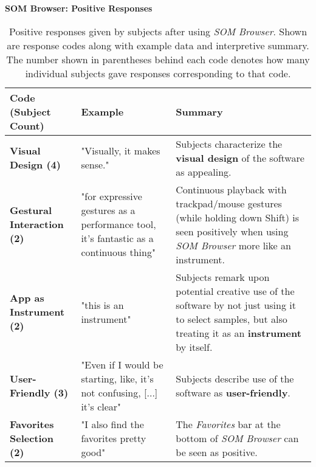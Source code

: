 \begin{table}[!htb]
  \renewcommand{\arraystretch}{1.2}
  \centering
  \textbf{SOM Browser: Positive Responses} \\ [3mm]
  \footnotesize
  \colorbox{light-bg}{
  \begin{tabular}{ p{4.0cm} p{4.75cm} p{4.75cm} }
  \hline
    \textbf{Code (Subject Count)} & \textbf{Example} & \textbf{Summary} \\
    \hline
    \textbf{Visual Design (4)}
    &
    "Visually, it makes sense."
    &
    Subjects characterize the \textbf{visual design} of the software as
    appealing.
    \\
    \textbf{Gestural Interaction (2)}
    &
    "for expressive gestures as a performance tool, it’s fantastic as a
    continuous thing"
    &
    Continuous playback with trackpad/mouse gestures (while holding down Shift)
    is seen positively when using \textit{SOM Browser} more like an instrument.
    \\
    \textbf{App as Instrument (2)}
    &
    "this is an instrument"
    &
    Subjects remark upon potential creative use of the software by not just
    using it to select samples, but also treating it as an \textbf{instrument}
    by itself.
    \\
    \textbf{User-Friendly (3)}
    &
    "Even if I would be starting, like, it's not confusing, [...] it’s clear"
    &
    Subjects describe use of the software as \textbf{user-friendly}.
    \\
    \textbf{Favorites Selection (2)}
    &
    "I also find the favorites pretty good"
    &
    The \textit{Favorites} bar at the bottom of \textit{SOM Browser} can be seen
    as positive.
    \\
  \end{tabular}}
  \caption[\textit{SOM Browser}: Positive Responses]{Positive responses given
  by subjects after using \textit{SOM Browser}. Shown are response codes along
  with example data and interpretive summary. The number shown in parentheses
  behind each code denotes how many individual subjects gave responses
  corresponding to that code.}
  \label{table:responses_som-browser_positive}
\end{table}

